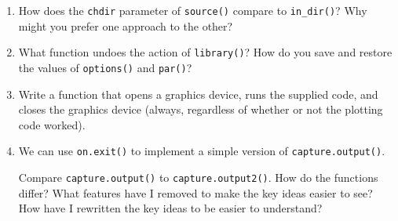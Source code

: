 \begin{enumerate}
\def\labelenumi{\arabic{enumi}.}
\item
  How does the \texttt{chdir} parameter of \texttt{source()} compare to
  \texttt{in\_dir()}? Why might you prefer one approach to the other?
\item
  What function undoes the action of \texttt{library()}? How do you save
  and restore the values of \texttt{options()} and \texttt{par()}?
\item
  Write a function that opens a graphics device, runs the supplied code,
  and closes the graphics device (always, regardless of whether or not
  the plotting code worked).
\item
  We can use \texttt{on.exit()} to implement a simple version of
  \texttt{capture.output()}.

\begin{Shaded}
\begin{Highlighting}[]
\StringTok{ }
  \StringTok{ }\NormalTok{()}
  \NormalTok{(} \NormalTok{)}

  \NormalTok{(}\NormalTok{(), } \NormalTok{)}

\NormalTok{\}}
\NormalTok{(}\NormalTok{(}\NormalTok{, }\NormalTok{, }\NormalTok{, } \NormalTok{))}
\end{Highlighting}
\end{Shaded}

  Compare \texttt{capture.output()} to \texttt{capture.output2()}. How
  do the functions differ? What features have I removed to make the key
  ideas easier to see? How have I rewritten the key ideas to be easier
  to understand?
\end{enumerate}



